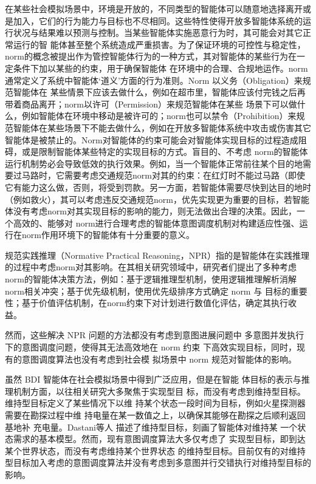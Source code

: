 在某些社会模拟场景中，环境是开放的，不同类型的智能体可以随意地选择离开或是加入，它们的行为能力与目标也不尽相同。这些特性使得开放多智能体系统的运行状况与结果难以预测与控制。当某些智能体实施恶意行为时，其可能会对其它正常运行的智 能体甚至整个系统造成严重损害。为了保证环境的可控性与稳定性，norm的概念被提出作为管控智能体行为的一种方式\cite{DBLP:journals/mags/SavarimuthuC11}，其对智能体的某些行为在一定条件下加以某些的约束，用于确保智能体 在环境中的合理、合规地运作。norm 通常定义了系统中智能体‘道义’方面的行为准则。Norm 以义务（Obligation）来规范智能体在 某些情景下应该去做什么，例如在超市里，智能体应该付完钱之后再带着商品离开；norm以许可（Permission）来规范智能体在某些 场景下可以做什么，例如智能体在环境中移动是被许可的；norm也可以禁令（Prohibition）来规范智能体在某些场景下不能去做什么，例如在开放多智能体系统中攻击或伤害其它智能体是被禁止的。Norm对智能体的约束可能会对智能体实现目标的过程造成阻碍，或是限制智能体某些特定的实现目标的方式。盲目的、不考虑 norm的智能体运行机制势必会导致低效的执行效果。例如，当一个智能体正常前往某个目的地需要过马路时，它需要考虑交通规范norm对其的约束：在红灯时不能过马路（即使它有能力这么做，否则，将受到罚款。另一方面，若智能体需要尽快到达目的地时（例如救火），其可以考虑违反交通规范norm，优先实现更为重要的目标，若智能体没有考虑norm对其实现目标的影响的能力，则无法做出合理的决策。因此，一个高效的、能够对 norm进行合理考虑的智能体意图调度机制对构建适应性强、运行在norm作用环境下的智能体有十分重要的意义。

规范实践推理（Normative Practical Reasoning，NPR）指的是智能体在实践推理的过程中考虑norm对其影响。在其相关研究领域中，研究者们提出了多种考虑norm的智能体决策方法，例如：基于逻辑推理型机制\cite{DBLP:conf/agents/BroersenDHHT01,DBLP:conf/ijcai/KollingbaumN03}，使用逻辑推理解析消解norm相关冲突；基于优先级机制\cite{DBLP:conf/aamas/AlechinaDL12,DBLP:conf/dalt/LeePLDA14}，使用优先级排序方式确定 norm 与 目标的重要性；基于价值评估机制\cite{DBLP:journals/eaai/MeneguzziROVL15}，在norm约束下对计划进行数值化评估，确定其执行收益。

然而，这些解决 NPR 问题的方法都没有考虑到意图进展问题中 多意图并发执行下的意图调度问题，使得其无法高效地在 norm 约束 下高效实现目标，同时，现有的意图调度算法也没有考虑到社会模 拟场景中 norm 规范对智能体的影响。

虽然 BDI 智能体在社会模拟场景中得到广泛应用，但是在智能 体目标的表示与推理机制方面，以往相关研究大多聚焦于实现型目 标，而没有考虑到维持型目标。维持型目标定义了某些情况下以维 持某个状态一段时间为目标，例如火星探测器需要在勘探过程中维 持电量在某一数值之上，以确保其能够在勘探之后顺利返回基地补 充电量。Dastani等人\cite{DBLP:conf/atal/DastaniRM06} 描述了维持型目标，刻画了智能体对维持某 一个状态需求的基本模型。然而，现有意图调度算法大多仅考虑了 实现型目标，即到达某个世界状态，而没有考虑维持某个世界状态 的维持型目标。目前仅有的对维持型目标加入考虑的意图调度算法\cite{DBLP:conf/atal/DuffHT06,DBLP:journals/ci/DuffTH14,DBLP:conf/dalt/HindriksR07}并没有考虑到多意图并行交错执行对维持型目标的影响。

